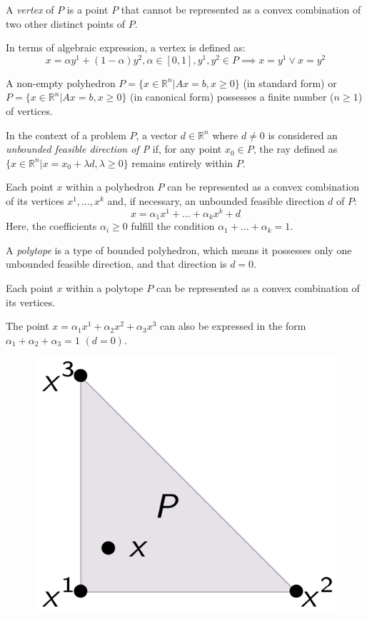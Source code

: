 \documentclass[12pt, a4paper]{report}
\begin{document}
    \begin{definition}
        A \emph{vertex} of $P$ is a point $P$ that cannot be represented as a convex combination of two other distinct points of $P$. 
    \end{definition}
    In terms of algebraic expression, a vertex is defined as:
    \[x= \alpha y^1+(1-\alpha)y^2, \alpha \in [0,1], y^1,y^2 \in P \implies x=y^1 \lor x=y^2\]
    \begin{property}
        A non-empty polyhedron $P=\{x \in \mathbb{R}^n|Ax=b,x \geq 0\}$ (in standard form) or $P=\{x \in \mathbb{R}^n|Ax=b,x \geq 0\}$ (in canonical form) possesses a finite number ($n \geq 1$) of vertices. 
    \end{property}
    \begin{definition}
        In the context of a problem $P$, a vector $d \in \mathbb{R}^n$ where $d \neq 0$ is considered an \emph{unbounded feasible direction of P} if, for any  point $x_0 \in P$, the ray defined as $\{x \in \mathbb{R}^n|x=x_0+\lambda d,\lambda \geq 0\}$ remains entirely within $P$.
    \end{definition}
    \begin{theorem}
        Each point $x$ within a polyhedron $P$ can be represented as a convex combination of its vertices $x^1,\dots,x^k$ and, if necessary, an unbounded feasible direction $d$ of $P$: 
        \[x=\alpha_1x^1+\dots+\alpha_kx^k+d\]
        Here, the coefficients $\alpha_i \geq 0$ fulfill the condition $\alpha_1+\dots+\alpha_k=1$. 
    \end{theorem}
    \begin{definition}
        A \emph{polytope} is a type of bounded polyhedron, which means it possesses only one unbounded feasible direction, and that direction is $d=0$. 
    \end{definition}
    Each point $x$ within a polytope $P$ can be represented as a convex combination of its vertices.
    \begin{example}
        The point $x=\alpha_1x^1+\alpha_2x^2+\alpha_3x^3$ can also be expressed in the form $\alpha_1+\alpha_2+\alpha_3=1$ $(d=0)$. 
        \begin{figure}[H]
            \centering
            \includegraphics[width=0.2\linewidth]{images/polytope.png}
        \end{figure}
    \end{example}
\end{document}
